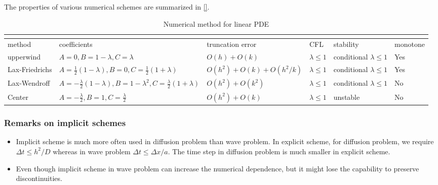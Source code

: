 \begin{refsection}
The properties of various numerical schemes are summarized in \autoref{}\cite[138]{holmes2007introduction}.

\begin{sidewaystable}
\centering
\caption{Numerical method for linear PDE \cite[136]{holmes2007introduction}}
\label{ch:numerical-methods:table:numericalschemefirstorderpde}
\begin{tabular}{|l|l|l|l|l|l|}
\hline
\multicolumn{6}{|l|}{} \\ \hline
method   & coefficients   & truncation error  & CFL  & stability  & monotone  \\ \hline
upperwind   & $A=0,B=1-\lambda,C=\lambda$  & $O(h)+O(k)$  &  $\lambda \leq 1$ & conditional $\lambda \leq 1$  &  Yes \\ \hline
Lax-Friedrichs   & $A=\frac{1}{2}(1-\lambda),B=0,C=\frac{1}{2}(1+\lambda)$  & $O(h^2)+O(k) + O(h^2/k)$  & $\lambda \leq 1$  &  conditional $\lambda \leq 1$ &  Yes \\ \hline
Lax-Wendroff   & $A=-\frac{\lambda}{2}(1-\lambda),B=1-\lambda^2,C=\frac{\lambda}{2}(1+\lambda)$  & $O(h^2)+O(k^2)$  & $\lambda \leq 1$  & conditional $\lambda \leq 1$  & No  \\ \hline
Center   & $A=-\frac{\lambda}{2},B=1,C=\frac{\lambda}{2}$  &  $O(h^2)+O(k)$ & $\lambda \leq 1$  & unstable  &  No \\ \hline
\end{tabular}
\end{sidewaystable}



\subsubsection{Remarks on implicit schemes}

\begin{remark}\cite[146]{holmes2007introduction}
	\begin{itemize}
		\item Implicit scheme is much more often used in diffusion problem than wave problem. In explicit scheme, for diffusion problem, we require $\Delta t \leq h^2/D$ whereas in wave problem $\Delta t\leq \Delta x / a$. The time step in diffusion problem is much  smaller in explicit scheme. 
		\item Even though implicit scheme in wave problem can increase the numerical dependence, but it might lose the capability to preserve discontinuities.
	\end{itemize}
\end{remark}






\end{refsection}
